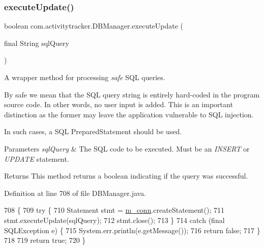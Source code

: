 \subsubsection{\texorpdfstring{execute\+Update()}{executeUpdate()}}
{\footnotesize\ttfamily boolean com.\+activitytracker.\+D\+B\+Manager.\+execute\+Update (\begin{DoxyParamCaption}\item[{final String}]{sql\+Query }\end{DoxyParamCaption})\hspace{0.3cm}{\ttfamily [private]}}

A wrapper method for processing {\itshape safe} S\+QL queries.

By safe we mean that the S\+QL query string is entirely hard-\/coded in the program source code. In other words, no user input is added. This is an important distinction as the former may leave the application vulnerable to S\+QL injection.

In such cases, a S\+QL Prepared\+Statement should be used.


\begin{DoxyParams}{Parameters}
{\em sql\+Query} & The S\+QL code to be executed. Must be an {\itshape I\+N\+S\+E\+RT} or {\itshape U\+P\+D\+A\+TE} statement.\\
\hline
\end{DoxyParams}
\begin{DoxyReturn}{Returns}
This method returns a boolean indicating if the query was successful. 
\end{DoxyReturn}


Definition at line 708 of file D\+B\+Manager.\+java.


\begin{DoxyCode}
708                                                          \{
709         \textcolor{keywordflow}{try} \{
710             Statement stmt = \mbox{\hyperlink{classcom_1_1activitytracker_1_1_d_b_manager_a064088d13ac09eb147fdc19268771521}{m\_conn}}.createStatement();
711             stmt.executeUpdate(sqlQuery);
712             stmt.close();
713         \}
714         \textcolor{keywordflow}{catch} (\textcolor{keyword}{final} SQLException e) \{
715             System.err.println(e.getMessage());
716             \textcolor{keywordflow}{return} \textcolor{keyword}{false};
717         \}
718 
719         \textcolor{keywordflow}{return} \textcolor{keyword}{true};
720     \}
\end{DoxyCode}
\mbox{\label{classcom_1_1activitytracker_1_1_d_b_manager_a0576baf67b45c7d2d0ba369052e4404e}} 
